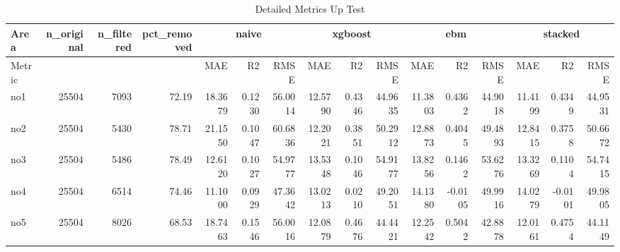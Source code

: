 \begin{landscape}

\begin{table}
\centering
\caption{Detailed Metrics Up Test}
\label{tab:metrics_up_test}
\begin{tabular}{|l|rrr|rrr|rrr|rrr|rrr|}
\toprule
Area & n_original & n_filtered & pct_removed & \multicolumn{3}{c|}{naive} & \multicolumn{3}{c|}{xgboost} & \multicolumn{3}{c|}{ebm} & \multicolumn{3}{c|}{stacked} \\
\midrule
Metric & & & & MAE & R2 & RMSE & MAE & R2 & RMSE & MAE & R2 & RMSE & MAE & R2 & RMSE \\
   no1 & 25504 & 7093 & 72.19 & 18.3679 & 0.1230 & 56.0014 & 12.5790 & 0.4346 & 44.9635 & 11.3803 & 0.4362 & 44.9018 & 11.4199 & 0.4349 & 44.9531 \\
   no2 & 25504 & 5430 & 78.71 & 21.1550 & 0.1047 & 60.6836 & 12.2021 & 0.3851 & 50.2912 & 12.8873 & 0.4045 & 49.4893 & 12.8415 & 0.3758 & 50.6672 \\
   no3 & 25504 & 5486 & 78.49 & 12.6120 & 0.1027 & 54.9777 & 13.5348 & 0.1046 & 54.9177 & 13.8256 & 0.1462 & 53.6276 & 13.3269 & 0.1104 & 54.7415 \\
   no4 & 25504 & 6514 & 74.46 & 11.1000 & 0.0929 & 47.3642 & 13.0213 & 0.0210 & 49.2051 & 14.1380 & -0.0105 & 49.9916 & 14.0279 & -0.0101 & 49.9805 \\
   no5 & 25504 & 8026 & 68.53 & 18.7463 & 0.1546 & 56.0016 & 12.0879 & 0.4676 & 44.4421 & 12.2542 & 0.5042 & 42.8878 & 12.0161 & 0.4754 & 44.1149 \\
\bottomrule
\end{tabular}
\end{table}


\end{landscape}
